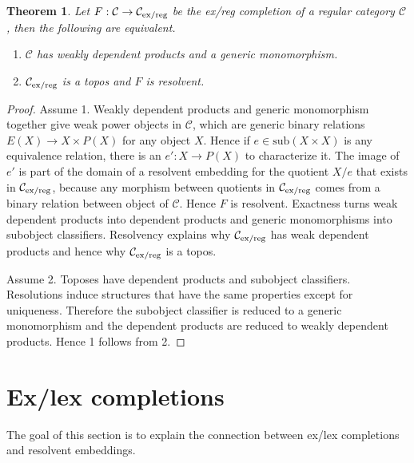 \documentclass[sort&compress,draft]{elsarticle}
\theoremstyle{plain}
\newtheorem{theorem}{Theorem}
\theoremstyle{definition}
\theoremstyle{remark}
\newcommand\hide[1]{}
\newcommand\cat\mathcal
\newcommand\of:
\begin{document}
\begin{theorem} Let $F:\cat C\to\cat C\exreg$ be the ex/reg completion of a regular category $\cat C$, then the following are equivalent.
\begin{enumerate}
\item $\cat C$ has \emph{weakly dependent products} and a \emph{generic monomorphism}.
\item $\cat C\exreg$ is a topos and $F$ is resolvent. 
\end{enumerate}
\end{theorem}

\newcommand\sub{\mathrm{sub}}
\begin{proof}
Assume 1. Weakly dependent products and generic monomorphism together give weak power objects in $\cat C$, which are generic binary relations $E(X)\to X\times P(X)$ for any object $X$. %
Hence if $e\in \sub(X\times X)$ is any equivalence relation, there is an $e'\of X \to P(X)$ to characterize it. The image of $e'$ is part of the domain of a resolvent embedding for the quotient $X/e$ that exists in $\cat C\exreg$, because any morphism between quotients in $\cat C\exreg$ comes from a binary relation between object of $\cat C$. %
Hence $F$ is resolvent.
Exactness turns weak dependent products into dependent products and generic monomorphisms into subobject classifiers. %
Resolvency explains why $\cat C\exreg$ has weak dependent products and hence why $\cat C\exreg$ is a topos. %

\hide{
The 'more direct proof' from the referee ignores resolvency of the regular completion, which is one of the two most important theorems of this paper. No wonder it can afford to be so simple.

I will try to get here more directly, and move the relation to other work to later in this paper.
}

Assume 2. Toposes have dependent products and subobject classifiers. Resolutions induce structures that have the same properties except for uniqueness. Therefore the subobject classifier is reduced to a generic monomorphism and the dependent products are reduced to weakly dependent products. Hence 1 follows from 2. %
\end{proof}

\hide{conclusion... }

\section{Ex/lex completions}
The goal of this section is to explain the connection between ex/lex completions and resolvent embeddings.
\end{document}
